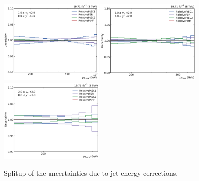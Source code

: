 \begin{figure}[htbp]
    \includegraphics[width=0.45\textwidth]{figures/measurement/jec_relunc_3_yb1ys0.pdf}
    \includegraphics[width=0.45\textwidth]{figures/measurement/jec_relunc_3_yb1ys1.pdf}\hfill
    \includegraphics[width=0.45\textwidth]{figures/measurement/jec_relunc_3_yb2ys0.pdf}
    \caption{Splitup of the uncertainties due to jet energy corrections.}
    \label{fig:jec_relunc_3}
\end{figure}

